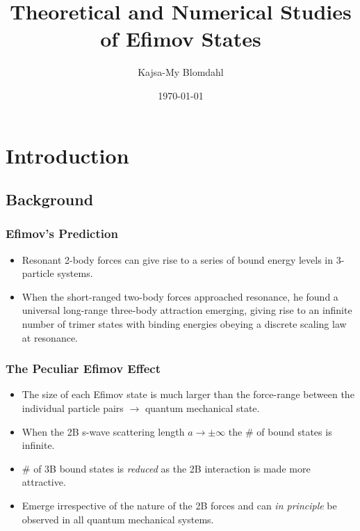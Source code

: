 \documentclass[hideothersubsections]{beamer}
\title[]{Theoretical and Numerical Studies of Efimov States} %
\author{Kajsa-My Blomdahl} %
\institute[SU] %
{
Stockholms Universitet \\ %
\medskip
\textit{kajsamy.blomdahl@fysik.su.se} %
}
\date{\today} %
\begin{document}
	
\begin{frame}
	\titlepage
\end{frame}

\section[Outline]{}
\frame{\tableofcontents}

\section{Introduction}
\subsection{Background}
\begin{frame}
\frametitle{Efimov's Prediction}
\begin{itemize}
	\item Resonant 2-body forces can give rise to a series of bound energy levels in 3-particle systems.
	\item When the short-ranged two-body forces approached resonance, he found a universal long-range three-body attraction emerging, giving rise to an infinite number of trimer states with binding energies obeying a discrete scaling law at resonance.
	
\end{itemize}
\end{frame}


\begin{frame}
\frametitle{The Peculiar Efimov Effect}
\begin{itemize}
\item The size of each Efimov state is much larger than the force-range between the individual particle pairs $\rightarrow$ quantum mechanical state.
\item When the 2B s-wave scattering length $a \rightarrow \pm\infty$ the $\#$ of bound states is infinite.
\item  $\#$ of 3B bound states is \textit{reduced} as the 2B interaction is made more attractive.
\item Emerge irrespective of the nature of the 2B forces and can \textit{in principle} be observed in all quantum mechanical systems. 
\end{itemize}
\end{frame}
\end{document}
